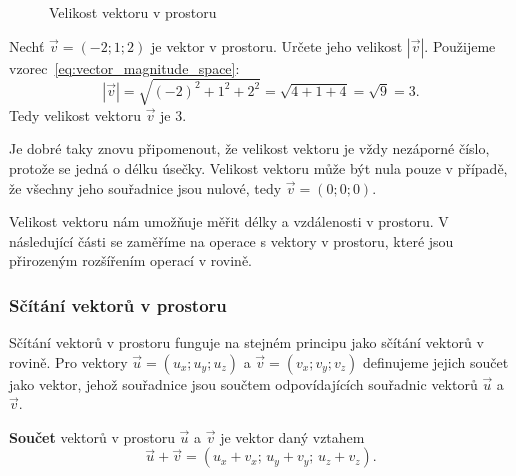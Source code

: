 \begin{figure}[H]
    \centering
    \caption{Velikost vektoru v prostoru}
    \label{fig:vector_magnitude_space}
\end{figure}

\begin{example}
    Nechť $\vec{v} = (-2; 1; 2)$ je vektor v prostoru. Určete jeho velikost $|\vec{v}|$.
    Použijeme vzorec~\eqref{eq:vector_magnitude_space}:
    \[
    |\vec{v}| = \sqrt{(-2)^2 + 1^2 + 2^2} = \sqrt{4 + 1 + 4} = \sqrt{9} = 3.
    \]
    Tedy velikost vektoru $\vec{v}$ je $3$.
\end{example}

Je dobré taky znovu připomenout, že velikost vektoru je vždy nezáporné číslo, 
protože se jedná o délku úsečky. Velikost vektoru může být nula pouze v případě, 
že všechny jeho souřadnice jsou nulové, tedy $\vec{v} = (0; 0; 0)$.

Velikost vektoru nám umožňuje měřit délky a vzdálenosti v prostoru.
V následující části se zaměříme na operace s vektory v prostoru,
které jsou přirozeným rozšířením operací v rovině.

\subsubsection{Sčítání vektorů v prostoru}\label{subsubsec:Vector_addition_in_space}
Sčítání vektorů v prostoru funguje na stejném principu jako sčítání vektorů v rovině.
Pro vektory $\vec{u} = (u_x; u_y; u_z)$ a $\vec{v} = (v_x; v_y; v_z)$ definujeme jejich součet jako vektor, jehož souřadnice jsou součtem odpovídajících souřadnic vektorů $\vec{u}$ a $\vec{v}$.

\begin{definition}\label{def:vector_addition_space}
    \textbf{Součet} vektorů v prostoru $\vec{u}$ a $\vec{v}$ je vektor daný vztahem
    \begin{equation}\label{eq:vector_addition_space}
        \vec{u} + \vec{v} = (u_x + v_x;\, u_y + v_y;\, u_z + v_z).
    \end{equation}
\end{definition}

